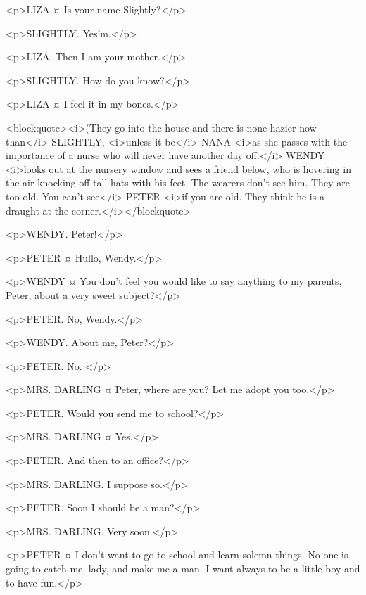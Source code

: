 <p>LIZA ¤
Is your name Slightly?</p>

<p>SLIGHTLY. Yes'm.</p>

<p>LIZA. Then I am your mother.</p>

<p>SLIGHTLY. How do you know?</p>

<p>LIZA ¤
I feel it in my bones.</p>

<blockquote><i>(They go into the house and there is none hazier now than</i> SLIGHTLY, <i>unless it be</i> NANA <i>as she passes with the importance of a nurse who will never have another day off.</i> WENDY <i>looks out at the nursery window and sees a friend below, who is hovering in the air knocking off tall hats with his feet. The wearers don't see him. They are too old. You can't see</i> PETER <i>if you are old. They think he is a draught at the corner.</i></blockquote>

<p>WENDY. Peter!</p>

<p>PETER ¤
Hullo, Wendy.</p>


<p>WENDY ¤
You don't feel you would like to say anything to my parents, Peter, about a very sweet subject?</p>

<p>PETER. No, Wendy.</p>

<p>WENDY. About me, Peter?</p>

<p>PETER. No.
</p>

<p>MRS. DARLING ¤
Peter, where are you? Let me adopt you too.</p>


<p>PETER. Would you send me to school?</p>

<p>MRS. DARLING ¤
Yes.</p>

<p>PETER. And then to an office?</p>

<p>MRS. DARLING. I suppose so.</p>

<p>PETER. Soon I should be a man?</p>

<p>MRS. DARLING. Very soon.</p>

<p>PETER ¤
I don't want to go to school and learn solemn things. No one is going to catch me, lady, and make me a man. I want always to be a little boy and to have fun.</p>

